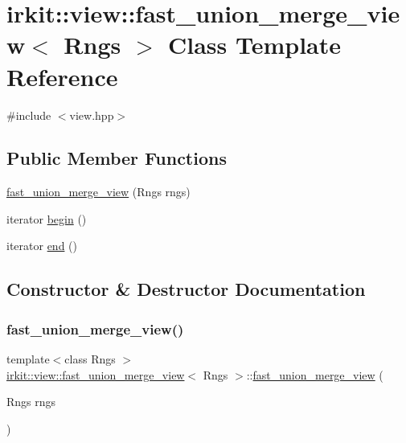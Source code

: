 \hypertarget{classirkit_1_1view_1_1fast__union__merge__view}{}\section{irkit\+:\+:view\+:\+:fast\+\_\+union\+\_\+merge\+\_\+view$<$ Rngs $>$ Class Template Reference}
\label{classirkit_1_1view_1_1fast__union__merge__view}


{\ttfamily \#include $<$view.\+hpp$>$}

\subsection*{Public Member Functions}
\begin{DoxyCompactItemize}
\item 
\mbox{\hyperlink{classirkit_1_1view_1_1fast__union__merge__view_a2231c301a5a2bfebfc34996fc18cbae3}{fast\+\_\+union\+\_\+merge\+\_\+view}} (Rngs rngs)
\item 
iterator \mbox{\hyperlink{classirkit_1_1view_1_1fast__union__merge__view_ae204e072ecbd702c09c7813e05828138}{begin}} ()
\item 
iterator \mbox{\hyperlink{classirkit_1_1view_1_1fast__union__merge__view_aeabbfef53da70d55173f57ca04dd1070}{end}} ()
\end{DoxyCompactItemize}


\subsection{Constructor \& Destructor Documentation}
\mbox{\label{classirkit_1_1view_1_1fast__union__merge__view_a2231c301a5a2bfebfc34996fc18cbae3}} 
\subsubsection{\texorpdfstring{fast\+\_\+union\+\_\+merge\+\_\+view()}{fast\_union\_merge\_view()}}
{\footnotesize\ttfamily template$<$class Rngs $>$ \\
\mbox{\hyperlink{classirkit_1_1view_1_1fast__union__merge__view}{irkit\+::view\+::fast\+\_\+union\+\_\+merge\+\_\+view}}$<$ Rngs $>$\+::\mbox{\hyperlink{classirkit_1_1view_1_1fast__union__merge__view}{fast\+\_\+union\+\_\+merge\+\_\+view}} (\begin{DoxyParamCaption}\item[{Rngs}]{rngs }\end{DoxyParamCaption})\hspace{0.3cm}{\ttfamily [inline]}}




